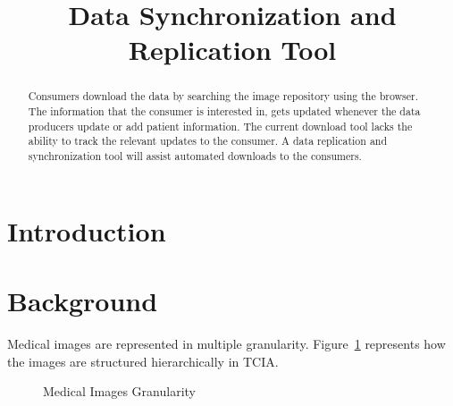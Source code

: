 \documentclass[conference]{IEEEtran}
\begin{document}
\title{Data Synchronization and Replication Tool}

\author{
\and
{}
}
\maketitle

\begin{abstract}
Consumers download the data by searching the image repository using the browser. The information that the consumer is interested in, gets updated whenever the data producers update or add patient information. The current download tool lacks the ability to track the relevant updates to the consumer. A data replication and synchronization tool will assist automated downloads to the consumers.
\end{abstract}

\IEEEpeerreviewmaketitle

\section{Introduction}
\section{Background}
Medical images are represented in multiple granularity. Figure~\ref{fig:granularity} represents how the images are structured hierarchically in TCIA.
\begin{figure}[ht]
\begin{center}
\end{center}
 \caption{Medical Images Granularity}
 \label{fig:granularity}
\end{figure}
\end{document}
